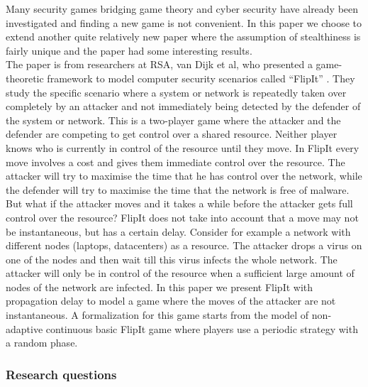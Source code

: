 Many security games bridging game theory and cyber security have already been investigated and finding a new game is not convenient. In this paper we choose to extend another quite relatively new paper where the assumption of stealthiness is fairly unique and the paper had some interesting results.\\ 
 The paper is from researchers at RSA, van Dijk et al,  who presented a game-theoretic framework to model computer security scenarios called ``FlipIt'' \cite{FlipIt}. They study the specific scenario where a system or network is repeatedly taken over completely by an attacker and not immediately being detected by the defender of the system or network. This is a two-player game where the attacker and the defender are competing to get control over a shared resource. Neither player knows who is currently in control of the resource until they move. In FlipIt every move involves a cost and gives them immediate control over the resource. The attacker will try to maximise the time that he has control over the network, while the defender will try to maximise the time that the network is free of malware. \\
 But what if the attacker moves and it takes a while before the attacker gets full control over the resource? FlipIt does not take into account that a move may not be instantaneous, but has a certain delay. Consider for example a network with different nodes (laptops, datacenters) as a resource. The attacker drops a virus on one of the nodes and then wait till this virus infects the whole network. The attacker will only be in control of the resource when a sufficient large amount of nodes of the network are infected. In this paper we present FlipIt with propagation delay to model a game where the moves of the attacker are not instantaneous. A formalization for this game starts from the model of non-adaptive continuous basic FlipIt game where players use a periodic strategy with a random phase.   \\

\subsubsection{Research questions}


